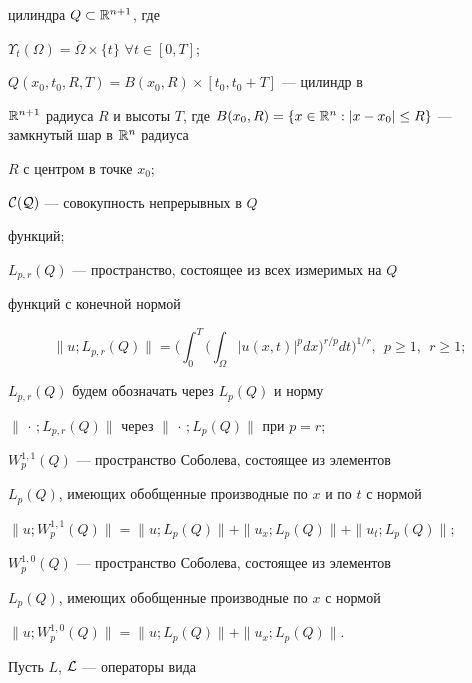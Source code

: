 цилиндра $Q\subset\Bbb{R}^{n+1}$, где


$\Upsilon_t(\Omega)=\overline{\Omega}\times\{t\}$ \; $\forall t\in


[0,T]$;





$Q(x_0,t_0,R,T)=B(x_0,R)\times[t_0,t_0+T]$ --- цилиндр в


$\Bbb{R}^{n+1}$ радиуса $R$ и высоты $T$, где $B(x_0, R)=


\{x\in \Rn : |x-x_0| \le R\}$ --- замкнутый шар в $\Rn$ радиуса


$R$ с центром в точке $x_0$;





$\cal{C}(Q)$ --- совокупность непрерывных в $Q$


функций;





$L_{p,r}(Q)$ --- пространство, состоящее из всех измеримых на $Q$


функций с конечной нормой


$$


\|u;L_{p,r}(Q)\|=\bigg(\int_{0}^{T}\bigg(\int_{\Omega}


|u(x,t)|^{p}dx\bigg)^{r/p}dt\bigg)^{1/r},\ \ p\geq 1,\ \ r\geq 1;


$$


$L_{p,r}(Q)$ будем обозначать через $L_{p}(Q)$ и норму


$\|\,\cdot\,;L_{p,r}(Q)\|$ через $\|\,\cdot\,;L_{p}(Q)\|$ при $p=r$; 


$W^{1, 1}_p(Q)$ --- пространство Соболева, состоящее из элементов


$L_p(Q)$, имеющих обобщенные производные по $x$ и по $t$ с нормой


$\|u;W^{1, 1}_p(Q)\|=\|u; L_{p}(Q)\|+\|u_x;L_{p}(Q)\|+\|u_t;L_{p}(Q)\|;$





$W^{1, 0}_p(Q)$ --- пространство Соболева, состоящее из элементов


$L_p(Q)$, имеющих обобщенные производные по $x$ с нормой


$\|u;W^{1, 0}_p(Q)\|=\|u; L_{p}(Q)\|+\|u_x; L_{p}(Q)\|$.





Пусть $L$, $\cal{L}$ --- операторы вида


$$


